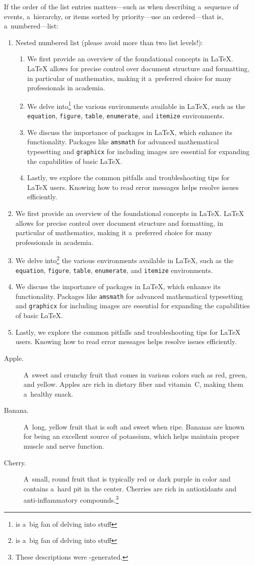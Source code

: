 \renewcommand{\testlist}{%
	\item We first provide an overview of the foundational concepts in LaTeX. LaTeX allows for precise control over document structure and formatting, in particular of mathematics, making it a~preferred choice for many professionals in academia.
	\item We delve into\footnote{\caps{AI} is a~big fan of delving into stuff \textellipsis} the various environments available in LaTeX, such as the \texttt{equation}, \texttt{figure}, \texttt{table}, \texttt{enumerate}, and \texttt{itemize} environments.
	\item We discuss the importance of packages in LaTeX, which enhance its functionality. Packages like \texttt{amsmath} for advanced mathematical typesetting and \texttt{graphicx} for including images are essential for expanding the capabilities of basic LaTeX.
	\item Lastly, we explore the common pitfalls and troubleshooting tips for LaTeX users. Knowing how to read error messages helps resolve issues efficiently.
}

\displaybaselinegrid%
If the order of the list entries matters---such as when describing a~sequence of events, a~hierarchy, or items sorted by priority---use an ordered---that is, a~numbered---list:%
\begin{enumerate}
	\item Nested numbered list (please avoid more than two list levels!):
		\begin{enumerate}
			\testlist
		\end{enumerate}
	\testlist
\end{enumerate}

\begin{description}
	\item[Apple.] A~sweet and crunchy fruit that comes in various colors such as red, green, and yellow. Apples are rich in dietary fiber and vitamin~C, making them a~healthy snack.
	\item[Banana.] A~long, yellow fruit that is soft and sweet when ripe. Bananas are known for being an excellent source of potassium, which helps maintain proper muscle and nerve function.
	\item[Cherry.] A~small, round fruit that is typically red or dark purple in color and contains a~hard pit in the center. Cherries are rich in antioxidants and anti-inflammatory compounds.\footnote{These descriptions were -generated.}
\end{description}

